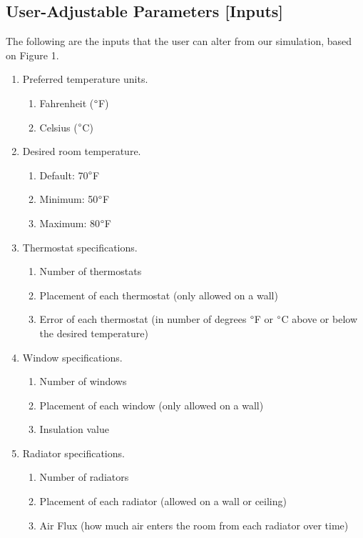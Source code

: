 \documentclass[conference,letterpaper]{IEEEtran}
\begin{document}
\subsection{User-Adjustable Parameters [Inputs]}
\label{sec:Parameters}
The following are the inputs that the user can alter from our simulation, based on Figure 1.

\begin{enumerate}
    \item Preferred temperature units.
    \begin{enumerate}
        \item Fahrenheit ($\degree$F)
        \item Celsius ($\degree$C)
    \end{enumerate}
    \item Desired room temperature.
    \begin{enumerate}
        \item Default: 70$\degree$F
        \item Minimum: 50$\degree$F
        \item Maximum: 80$\degree$F
    \end{enumerate}
    \item Thermostat specifications.
    \begin{enumerate}
        \item Number of thermostats
        \item Placement of each thermostat (only allowed on a wall)
        \item Error of each thermostat (in number of degrees $\degree$F or $\degree$C above or below the desired temperature)
    \end{enumerate}
    \item Window specifications.
    \begin{enumerate}
        \item Number of windows
        \item Placement of each window (only allowed on a wall)
        \item Insulation value
    \end{enumerate}
    \item Radiator specifications.
    \begin{enumerate}
        \item Number of radiators
        \item Placement of each radiator (allowed on a wall or ceiling)
        \item Air Flux (how much air enters the room from each radiator over time)

\end{enumerate}
\end{enumerate}
\end{document}
